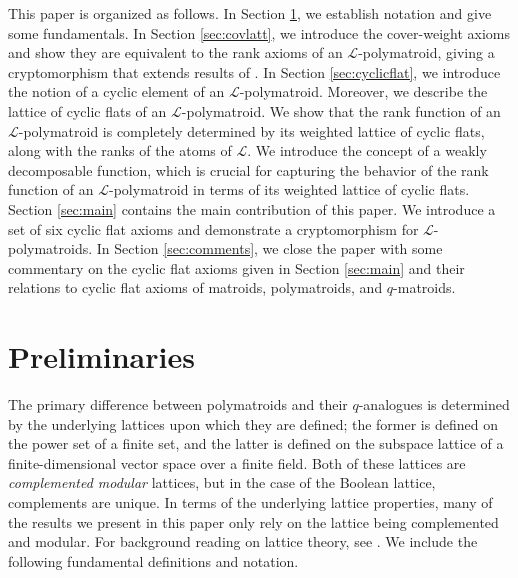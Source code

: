 \documentclass[a4paper,11pt,reqno]{article}
\theoremstyle{definition}
\newcommand{\mL}{\mathcal{L}}
\begin{document}
This paper is organized as follows. In Section \ref{sec:prelim}, we establish notation and give some fundamentals. In Section \ref{sec:covlatt}, we introduce the cover-weight axioms and show they are equivalent to the rank axioms of an $\mL$-polymatroid, giving a cryptomorphism that extends results of \cite{BCJ17,BF22}. In Section \ref{sec:cyclicflat}, we introduce the notion of a cyclic element of an $\mL$-polymatroid. Moreover, we describe the lattice of cyclic flats of an $\mathcal{L}$-polymatroid. We show that the rank function of an $\mL$-polymatroid is completely determined by its weighted lattice of cyclic flats, along with the ranks of the atoms of $\mL$. We introduce the concept of a weakly decomposable function, which is crucial for capturing the behavior of the rank function of an $\mL$-polymatroid in terms of its weighted lattice of cyclic flats. Section \ref{sec:main} contains the main contribution of this paper. We introduce a set of six cyclic flat axioms and demonstrate a cryptomorphism for $\mL$-polymatroids. In Section \ref{sec:comments}, we close the paper with some commentary on the cyclic flat axioms given in Section \ref{sec:main} and their relations to cyclic flat axioms of matroids, polymatroids, and $q$-matroids.

\section{Preliminaries}\label{sec:prelim}
The primary difference between polymatroids and their $q$-analogues is determined by the underlying lattices upon which they are defined; the former is defined on the power set of a finite set, and the latter is defined on the subspace lattice of a finite-dimensional vector space over a finite field. Both of these lattices are \emph{complemented modular} lattices, but in the case of the Boolean lattice, complements are unique. In terms of the underlying lattice properties, many of the results we present in this paper only rely on the lattice being complemented and modular. For background reading on lattice theory, see \cite{birkhoff_lattice,gratz_lattice,romanlattices}. We include the following fundamental definitions and notation.
\end{document}

